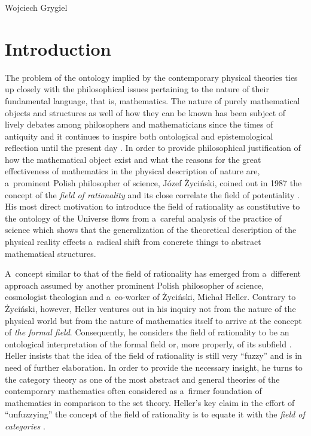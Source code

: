 \begin{artengenv}{Wojciech Grygiel}
\section{Introduction}
\lettrine[loversize=0.13,lines=2,lraise=-0.01,nindent=0em,findent=0.2pt]%
{T}{}he problem of the ontology implied by the contemporary physical theories ties up closely with the philosophical issues pertaining to the nature of their fundamental language, that is, mathematics. The nature of purely mathematical objects and structures as well of how they can be known has been subject of lively debates among philosophers and mathematicians since the times of antiquity and it continues to inspire both ontological and epistemological reflection until the present day
\parencite[e.g.][]{shapiro_thinking_2000}. %
 In order to provide philosophical justification of how the mathematical object exist and what the reasons for the great effectiveness of mathematics in the physical description of nature are, a~prominent Polish philosopher of science, Józef Życiński, coined out in 1987 the concept of the \textit{field of rationality} and its close correlate the field of potentiality 
\parencites[][]{zycinski_filozoficzne_1987}[][]{zycinski_teizm_1988}. %
 His most direct motivation to introduce the field of rationality as constitutive to the ontology of the Universe flows from a~careful analysis of the practice of science which shows that the generalization of the theoretical description of the physical reality effects a~radical shift from concrete things to abstract mathematical structures.

A~concept similar to that of the field of rationality has emerged from a~different approach assumed by another prominent Polish philosopher of science, cosmologist theologian and a~co-worker of Życiński, Michał Heller. Contrary to Życiński, however, Heller ventures out in his inquiry not from the nature of the physical world but from the nature of mathematics itself to arrive at the concept of \textit{the formal field}. Consequently, he considers the field of rationality to be an ontological interpretation of the formal field or, more properly, of its subfield
\parencite[][p.442]{heller_field_2014}. %
 Heller insists that the idea of the field of rationality is still very ``fuzzy'' and is in need of further elaboration. In order to provide the necessary insight, he turns to the category theory as one of the most abstract and general theories of the contemporary mathematics often considered as a~firmer foundation of mathematics in comparison to the set theory. Heller's key claim in the effort of ``unfuzzying'' the concept of the field of rationality is to equate it with the \textit{field of categories} 
\parencite[][p.453]{heller_field_2014}.%



\end{artengenv}
